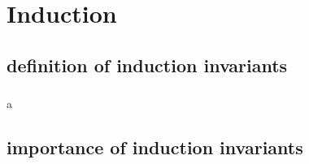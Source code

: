 \section{Induction}
\subsection{definition of induction invariants}
\begin{frame}
    \frametitle{}

    a

\end{frame}
\subsection{importance of induction invariants}
